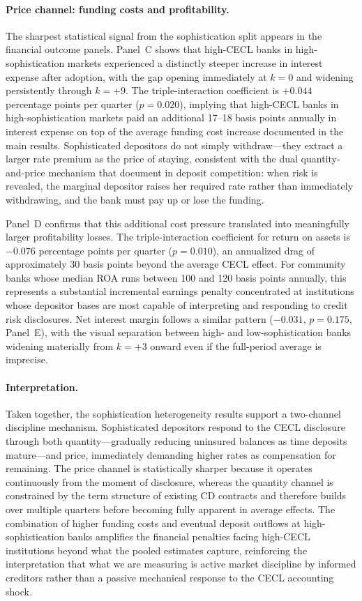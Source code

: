 \paragraph{Price channel: funding costs and profitability.}
The sharpest statistical signal from the sophistication split appears in the
financial outcome panels.  Panel~C shows that high-CECL banks in
high-sophistication markets experienced a distinctly steeper increase in interest
expense after adoption, with the gap opening immediately at $k=0$ and widening
persistently through $k=+9$.  The triple-interaction coefficient is $+0.044$
percentage points per quarter ($p = 0.020$), implying that high-CECL banks in
high-sophistication markets paid an additional 17--18 basis points annually in
interest expense on top of the average funding cost increase documented in the
main results.  Sophisticated depositors do not simply withdraw---they extract a
larger rate premium as the price of staying, consistent with the dual quantity-and-price
mechanism that \citet{egan2017deposit} document in deposit competition: when risk
is revealed, the marginal depositor raises her required rate rather than
immediately withdrawing, and the bank must pay up or lose the funding.

Panel~D confirms that this additional cost pressure translated into meaningfully
larger profitability losses.  The triple-interaction coefficient for return on
assets is $-0.076$ percentage points per quarter ($p = 0.010$), an annualized
drag of approximately 30 basis points beyond the average CECL effect.  For
community banks whose median ROA runs between 100 and 120 basis points annually,
this represents a substantial incremental earnings penalty concentrated at
institutions whose depositor bases are most capable of interpreting and responding
to credit risk disclosures.  Net interest margin follows a similar pattern
($-0.031$, $p = 0.175$, Panel~E), with the visual separation between high- and
low-sophistication banks widening materially from $k=+3$ onward even if the
full-period average is imprecise.

\paragraph{Interpretation.}
Taken together, the sophistication heterogeneity results support a two-channel
discipline mechanism.  Sophisticated depositors respond to the CECL disclosure
through both quantity---gradually reducing uninsured balances as time deposits
mature---and price, immediately demanding higher rates as compensation for
remaining.  The price channel is statistically sharper because it operates
continuously from the moment of disclosure, whereas the quantity channel is
constrained by the term structure of existing CD contracts and therefore builds
over multiple quarters before becoming fully apparent in average effects.  The
combination of higher funding costs and eventual deposit outflows at
high-sophistication banks amplifies the financial penalties facing high-CECL
institutions beyond what the pooled estimates capture, reinforcing the
interpretation that what we are measuring is active market discipline by informed
creditors rather than a passive mechanical response to the CECL accounting shock.

